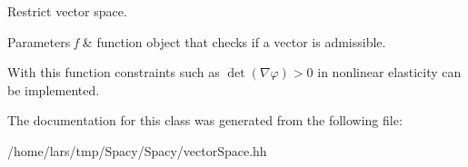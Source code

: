 Restrict vector space. 


\begin{DoxyParams}{Parameters}
{\em f} & function object that checks if a vector is admissible.\\
\hline
\end{DoxyParams}
With this function constraints such as $\det(\nabla\varphi)>0$ in nonlinear elasticity can be implemented. 

The documentation for this class was generated from the following file\+:\begin{DoxyCompactItemize}
\item 
/home/lars/tmp/\+Spacy/\+Spacy/vector\+Space.\+hh\end{DoxyCompactItemize}
